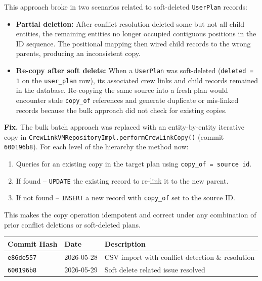 \documentclass[12pt,a4paper]{article}
\begin{document}
This approach broke in two scenarios related to soft-deleted \texttt{UserPlan}
records:
\begin{itemize}[leftmargin=1.5em]
    \item \textbf{Partial deletion:} After conflict resolution deleted some but
          not all child entities, the remaining entities no longer occupied
          contiguous positions in the ID sequence. The positional mapping then
          wired child records to the wrong parents, producing an inconsistent
          copy.
    \item \textbf{Re-copy after soft delete:} When a \texttt{UserPlan} was
          soft-deleted (\texttt{deleted = 1} on the \texttt{user\_plan} row),
          its associated crew links and child records remained in the database.
          Re-copying the same source into a fresh plan would encounter stale
          \texttt{copy\_of} references and generate duplicate or mis-linked
          records because the bulk approach did not check for existing copies.
\end{itemize}

\textbf{Fix.} The bulk batch approach was replaced with an entity-by-entity
iterative copy in \texttt{CrewLinkVMRepositoryImpl.performCrewLinkCopy()}
(commit \texttt{600196b8}). For each level of the hierarchy the method now:
\begin{enumerate}[leftmargin=1.5em]
    \item Queries for an existing copy in the target plan using
          \texttt{copy\_of = \textlangle source\,id\textrangle}.
    \item If found -- \texttt{UPDATE} the existing record to re-link it to the
          new parent.
    \item If not found -- \texttt{INSERT} a new record with \texttt{copy\_of}
          set to the source ID.
\end{enumerate}
This makes the copy operation idempotent and correct under any combination of
prior conflict deletions or soft-deleted plans.

\medskip
\begin{tabular}{@{} L{2.6cm} L{2.6cm} L{8cm} @{}}
\toprule
\textbf{Commit Hash} & \textbf{Date} & \textbf{Description} \\
\midrule
\texttt{e86de557} & 2026-05-28 & CSV import with conflict detection \& resolution \\
\texttt{600196b8} & 2026-05-29 & Soft delete related issue resolved \\
\bottomrule
\end{tabular}
\end{document}
